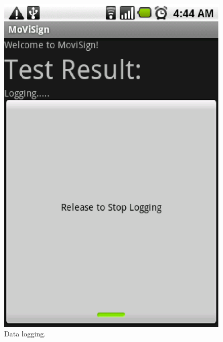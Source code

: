\documentclass[12pt]{article}
\begin{document}
\begin{figure}[ht]
\begin{minipage}[b]{0.3\textwidth}
\includegraphics[width=\textwidth]{logging}
\caption{Data logging.}
\label{fig:logging}
\end{minipage}
\begin{minipage}[b]{0.3\textwidth}
\centering

\end{minipage}
\end{figure}
\end{document}
